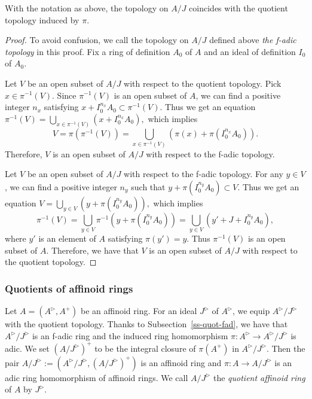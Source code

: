 \begin{lem}\label{l-2quot-top}
With the notation as above, the topology on $A/J$ coincides with the quotient topology induced by $\pi$.  
\end{lem}

\begin{proof}
To avoid confusion, we call the topology on $A/J$ defined above 
{\em the f-adic topology} in this proof. 
Fix a ring of definition $A_0$ of $A$ and an ideal of definition $I_0$ of $A_0$. 

Let $V$ be an open subset of $A/J$ with respect to the quotient topology. 
Pick $x \in \pi^{-1}(V)$. 
Since $\pi^{-1}(V)$ is an open subset of $A$, 
we can find a positive integer $n_x$ 
satisfying $x+I_0^{n_x}A_0 \subset \pi^{-1}(V)$. 
Thus we get an equation 
$\pi^{-1}(V)=\bigcup_{x \in \pi^{-1}(V)} (x+I_0^{n_x}A_0),$ which implies 
$$V=\pi\left(\pi^{-1}(V)\right)=\bigcup_{x \in \pi^{-1}(V)} \left(\pi(x)+\pi(I_0^{n_x}A_0)\right).$$
Therefore, $V$ is an open subset of $A/J$ with respect to the f-adic topology. 

Let $V$ be an open subset of $A/J$ with respect to the f-adic topology. 
For any $y \in V$, we can find a positive integer $n_y$ such that 
$y+\pi(I_0^{n_y}A_0) \subset V$. 
Thus we get an equation $V=\bigcup_{y \in V} (y+\pi(I_0^{n_y}A_0)),$ 
which implies 
$$\pi^{-1}(V)=\bigcup_{y \in V} \pi^{-1}(y+\pi(I_0^{n_y}A_0))
=\bigcup_{y \in V} (y'+J+I_0^{n_y}A_0),$$
where $y'$ is an element of $A$ satisfying $\pi(y')=y$. 
Thus $\pi^{-1}(V)$ is an open subset of $A$. 
Therefore, we have that $V$ is an open subset of $A/J$ with respect to the quotient topology. 
\end{proof}

\subsubsection{Quotients of affinoid rings}\label{ss-quot-aff}


Let $A=(A^{\rhd}, A^+)$ be an affinoid ring. 
For an ideal $J^{\rhd}$ of $A^{\rhd}$, 
we equip $A^{\rhd}/J^{\rhd}$ with the quotient topology. 
Thanks to Subsection~\ref{ss-quot-fad}, 
we have that $A^{\rhd}/J^{\rhd}$ is an f-adic ring and 
the induced ring homomorphism $\pi:A^{\rhd} \to A^{\rhd}/J^{\rhd}$ is adic. 
We set $(A/J^{\rhd})^+$ to be the integral closure of $\pi(A^+)$ in 
$A^{\rhd}/J^{\rhd}$. 
Then the pair $A/J^{\rhd}:=(A^{\rhd}/J^{\rhd}, (A/J^{\rhd})^+)$ 
is an affinoid ring and 
$\pi:A \to A/J^{\rhd}$ is an adic ring homomorphism of affinoid rings. 
We call $A/J^{\rhd}$ the {\em quotient affinoid ring} of $A$ by $J^{\rhd}$. 


